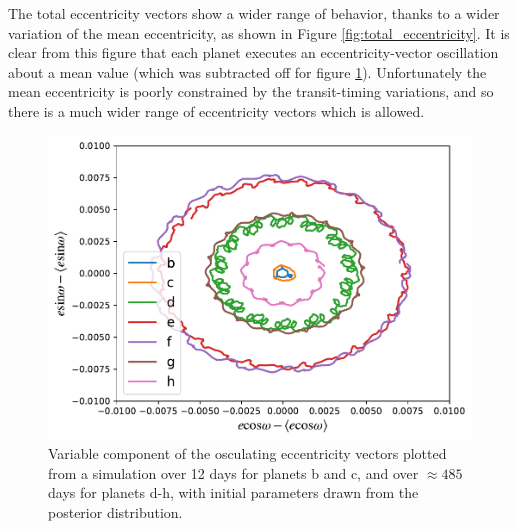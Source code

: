 \documentclass[fleqn,usenatbib]{mnras} %
\begin{document}
The total eccentricity vectors show a wider range of behavior, thanks to a wider variation
of the mean eccentricity, as shown in Figure \ref{fig:total_eccentricity}.  It is clear
from this figure that each planet executes an eccentricity-vector oscillation about a
mean value (which was subtracted off for figure \ref{fig:forced_eccentricity}).  Unfortunately the mean eccentricity is poorly constrained by the transit-timing
variations, and so there is a much wider range of eccentricity vectors which is allowed.

\begin{figure}
    \centering
    \includegraphics[width=\hsize]{figures/T1_evector_forced.pdf}
    \caption{Variable component of the osculating eccentricity vectors plotted from a simulation over 12 days for planets b and c, and over $\approx 485$
    days for planets d-h, with initial parameters drawn from the posterior distribution.}
    \label{fig:forced_eccentricity}
\end{figure}
\end{document}
